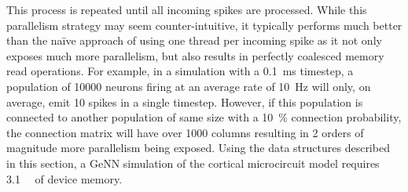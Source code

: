 \documentclass[utf8]{frontiersSCNS} %
\begin{document}
This process is repeated until all incoming spikes are processed.
While this parallelism strategy may seem counter-intuitive, it typically performs much better than the naïve approach of using one thread per incoming spike as it not only exposes much more parallelism, but also results in perfectly coalesced memory read operations.
For example, in a simulation with a \SI{0.1}{\milli\second} timestep, a population of \num{10000} neurons firing at an average rate of \SI{10}{\hertz} will only, on average, emit \num{10} spikes in a single timestep.
However, if this population is connected to another population of same size with a \SI{10}{\percent} connection probability, the connection matrix will have over \num{1000} columns resulting in 2 orders of magnitude more parallelism being exposed.
Using the data structures described in this section, a GeNN simulation of the cortical microcircuit model requires \SI{3.1}{\giga\byte} of device memory.
\end{document}
